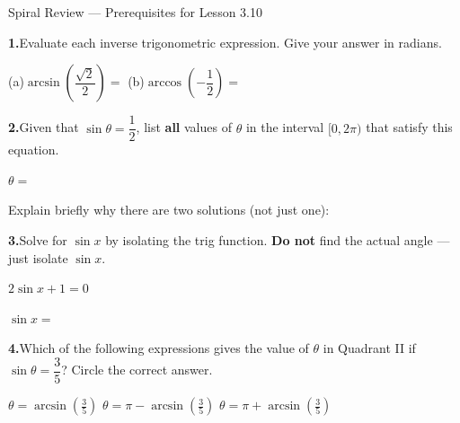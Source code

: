 \documentclass[10pt]{article}
\begin{document}
\namedateperiod

\vspace{0.10in}

\begin{notesbox}{Spiral Review --- Prerequisites for Lesson 3.10}

\textbf{1.}\quad Evaluate each inverse trigonometric expression.
Give your answer in radians.

\vspace{4pt}
(a)\quad $\arcsin\!\left(\dfrac{\sqrt{2}}{2}\right) = $ \blank{2.5cm}
\hspace{1cm}
(b)\quad $\arccos\!\left(-\dfrac{1}{2}\right) = $ \blank{2.5cm}

\vspace{0.14in}
\textbf{2.}\quad Given that $\sin\theta = \dfrac{1}{2}$, list \textbf{all}
values of $\theta$ in the interval $[0, 2\pi)$ that satisfy this equation.

\vspace{4pt}
$\theta = $ \blank{5cm}

\vspace{4pt}
Explain briefly why there are two solutions (not just one):

\vspace{0.14in}
\textbf{3.}\quad Solve for $\sin x$ by isolating the trig function.
\textbf{Do not} find the actual angle --- just isolate $\sin x$.

\vspace{4pt}
\hspace{1em}$2\sin x + 1 = 0$

\vspace{6pt}
$\sin x = $ \blank{3cm}

\vspace{0.14in}
\textbf{4.}\quad Which of the following expressions gives the value of
$\theta$ in Quadrant II if $\sin\theta = \dfrac{3}{5}$?
Circle the correct answer.

\vspace{4pt}
\hspace{2em}
$\displaystyle\theta = \arcsin\!\!\left(\tfrac{3}{5}\right)$
\hspace{2em}
$\displaystyle\theta = \pi - \arcsin\!\!\left(\tfrac{3}{5}\right)$
\hspace{2em}
$\displaystyle\theta = \pi + \arcsin\!\!\left(\tfrac{3}{5}\right)$

\end{notesbox}
\end{document}
